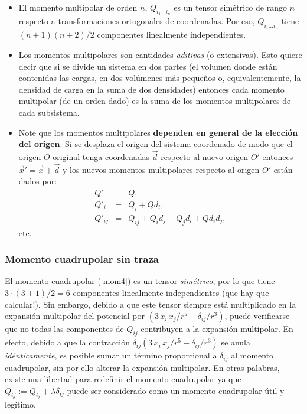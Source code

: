 \begin{itemize} 
\item El momento multipolar de orden $n$, $Q_{i_1\dots i_n}$ es un tensor simétrico de rango $n$ respecto a transformaciones ortogonales de coordenadas. Por eso, $Q_{i_1\dots i_n}$ tiene $(n+1)(n+2)/2$ componentes linealmente independientes.

\item Los momentos multipolares son cantidades \textit{aditivas} (o extensivas). Esto quiere decir que si se divide un sistema en dos partes (el volumen donde están contenidas las cargas, en dos volúmenes más pequeños o, equivalentemente, la densidad de carga en la suma de dos densidades) entonces cada momento multipolar (de un orden dado) es la suma de los momentos multipolares de cada subsistema.

\item Note que los momentos multipolares \textbf{dependen en general de la
elección del origen}. Si se desplaza el origen del sistema coordenado de modo que el origen $O$ original tenga coordenadas $\vec{d}$ respecto al nuevo origen $O'$ entonces
$\vec{x}'=\vec{x}+\vec{d}$ y los nuevos momentos multipolares respecto al origen $O'$ están dados por:
\begin{eqnarray}
 Q'&=&Q,\\
Q'_i&=&Q_i+Qd_i,\\
Q'_{ij}&=&Q_{ij}+Q_id_j+Q_jd_i+Qd_id_j,
\end{eqnarray}
etc.
\end{itemize}

\subsubsection{Momento cuadrupolar sin traza}\label{MCSM}
El momento cuadrupolar (\ref{mom4}) es un tensor \textit{simétrico}, por lo
que tiene ${3\cdot (3+1)}/{2}=6$ componentes linealmente independientes (que
hay que calcular!). Sin embargo, debido a que este tensor siempre está
multiplicado en la expansión multipolar del potencial por
$\left({3\,x_i\,x_j}/{r^5}-{\delta_{ij}}/{r^3}\right)$, puede
verificarse que no todas las componentes de $Q_{ij}$ contribuyen a la
expansión multipolar. En efecto, debido a que la contracción
$\delta_{ij}\left({3\,x_i\,x_j}/{r^5}-{\delta_{ij}}/{r^3}\right)$ se
anula \textit{idénticamente}, es posible sumar un término proporcional a
$\delta_{ij}$ al momento cuadrupolar, sin por ello alterar la expansión
multipolar. En otras palabras, existe una libertad para redefinir el momento
cuadrupolar ya que $\tilde{Q}_{ij}:=Q_{ij}+\lambda\delta_{ij}$ puede ser
considerado como un momento cuadrupolar útil y legítimo. 

